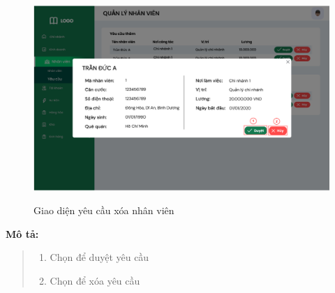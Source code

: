             \begin{figure}[!htp]
                \centering
                \includegraphics[width=12cm]{img/UI/admin/staff_request_delete.png}
                \label{28}
                \newline
                \caption{Giao diện yêu cầu xóa nhân viên}
            \end{figure}
            \textbf{Mô tả:}  
            \begin{quote}
                \begin{enumerate}
                    \item Chọn để duyệt yêu cầu
                    \item Chọn để xóa yêu cầu
                \end{enumerate}
            \end{quote}
        
